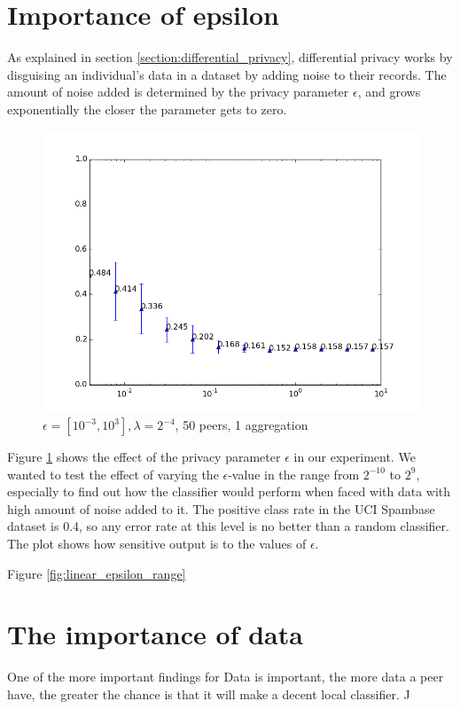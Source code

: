 \section{Importance of epsilon}
As explained in section \ref{section:differential_privacy}, differential privacy works by disguising an individual's data in a dataset by adding noise to their records. The amount of noise added is determined by the privacy parameter  $\epsilon$, and grows exponentially the closer the parameter gets to zero. 

\begin{figure}[H]
	\centering
	\includegraphics[width=\textwidth]{fig/spambase/eps2e-8-2e8,budg=eps,peers10,groups10,reg2e-2-data368-pubAll-spam-baseline-testset}
 	\caption{$\epsilon = [10^{-3}, 10^{3}], \lambda = 2^{-4}$, 50 peers, 1 aggregation}
 	\label{fig:epsilon_big_range}
\end{figure}
 
Figure \ref{fig:epsilon_big_range} shows the effect of the privacy parameter $\epsilon$ in our experiment. We wanted to test the effect of varying the $\epsilon$-value in the range from $2^{-10}$ to $2^9$, especially to find out how the classifier would perform when faced with data with high amount of noise added to it. The positive class rate in the UCI Spambase dataset is 0.4, so any error rate at this level is no better than a random classifier. The plot shows how sensitive output is to the values of $\epsilon$.

Figure \ref{fig:linear_epsilon_range} 

\section{The importance of data} \label{importance_of_data}
One of the more important findings for 
Data is important, the more data a peer have, the greater the chance is that it will make a decent local classifier. J

